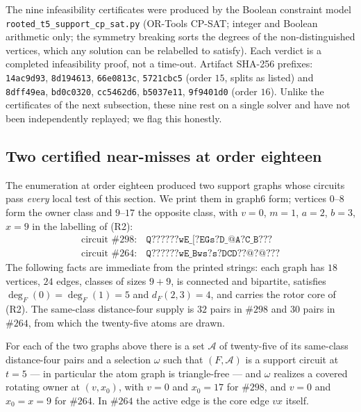 The nine infeasibility certificates were produced by the Boolean
constraint model \texttt{rooted\_t5\_support\_cp\_sat.py} (OR-Tools
CP-SAT; integer and Boolean arithmetic only; the symmetry breaking
sorts the degrees of the non-distinguished vertices, which any
solution can be relabelled to satisfy). Each verdict is a completed
infeasibility proof, not a time-out. Artifact SHA-256 prefixes:
\texttt{14ac9d93}, \texttt{8d194613}, \texttt{66e0813c},
\texttt{5721cbc5} (order \(15\), splits as listed) and
\texttt{8dff49ea}, \texttt{bd0c0320}, \texttt{cc5462d6},
\texttt{b5037e11}, \texttt{9f9401d0} (order \(16\)). Unlike the
certificates of the next subsection, these nine rest on a single
solver and have not been independently replayed; we flag this
honestly.

\subsection{Two certified near-misses at order eighteen}

The enumeration at order eighteen produced two support graphs whose
circuits pass \emph{every} local test of this section. We print them
in graph6 form; vertices \(0\)--\(8\) form the owner class and
\(9\)--\(17\) the opposite class, with
\(v=0\), \(m=1\), \(a=2\), \(b=3\), \(x=9\) in the labelling of
\textup{(R2)}:
\[
\begin{array}{ll}
\text{circuit } \#298: &
\texttt{Q??????wE\_[?EGs?D\_@A?C\_B???}\\[2pt]
\text{circuit } \#264: &
\texttt{Q??????wE\_Bws?s?DCD??@?@???}
\end{array}
\]
The following facts are immediate from the printed strings: each graph
has \(18\) vertices, \(24\) edges, classes of sizes \(9+9\), is
connected and bipartite, satisfies
\(\deg_F(0)=\deg_F(1)=5\) and \(d_F(2,3)=4\), and carries the rotor
core of \textup{(R2)}. The same-class distance-four supply is \(32\)
pairs in \(\#298\) and \(30\) pairs in \(\#264\), from which the
twenty-five atoms are drawn.

\begin{proposition}\label{prop:hits}
For each of the two graphs above there is a set \(\mathcal A\) of
twenty-five of its same-class distance-four pairs and a selection
\(\omega\) such that \((F,\mathcal A)\) is a support circuit at
\(t=5\) --- in particular the atom graph is triangle-free --- and
\(\omega\) realizes a covered rotating owner at \((v,x_0)\), with
\(v=0\) and \(x_0=17\) for \(\#298\), and \(v=0\) and \(x_0=x=9\) for
\(\#264\). In \(\#264\) the active edge is the core edge \(vx\)
itself.
\end{proposition}


